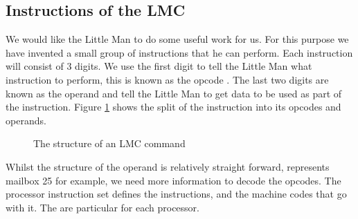 			\subsection{Instructions of the LMC}
				We would like the Little Man to do some useful work for us. For this purpose we have invented a small group of instructions that he can perform. Each instruction will consist of 3 digits. We use the first digit to tell the Little Man what instruction to perform, this is known as the opcode . The last two digits are known as the operand  and tell the Little Man to get data to be used as part of the instruction. Figure \ref{fig:LMCoperand} shows the split of the instruction into its opcodes and operands. 
				
				\begin{figure}[h]
					\centering
					\caption{\label{fig:LMCoperand} The structure of an LMC command}
				\end{figure}
			
				Whilst the structure of the operand is relatively straight forward,  represents mailbox 25 for example, we need more information to decode the opcodes. The processor instruction set defines the instructions, and the machine codes that go with it. The are particular for each processor.   
				
